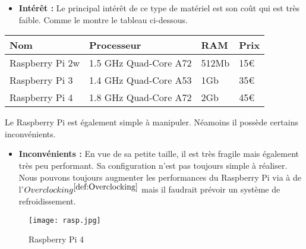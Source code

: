         \begin{flushleft}
            \begin{itemize}
                \item \textbf{Intérêt :}
                Le principal intérêt de ce type de matériel est son coût qui est très faible. Comme le montre le tableau ci-dessous.
            \end{itemize}                       

            \begin{center}
                \begin{tabular}{ |p{3cm}|p{3cm}|p{3cm}|p{3cm}|  }
                    \hline
                    Nom & Processeur & RAM & Prix\\
                    \hline
                    Raspberry Pi 2w & 1.5 GHz Quad-Core A72 & 512Mb & 15€\\
                    \hline
                    Raspberry Pi 3 & 1.4 GHz Quad-Core A53 & 1Gb & 35€\\
                    \hline
                    Raspberry Pi 4 & 1.8 GHz Quad-Core A72 & 2Gb & 45€\\
                    \hline
                \end{tabular}            
            \end{center}

            Le Raspberry Pi est également simple à manipuler. Néamoins il possède certains inconvénients.

            \begin{center}
                \begin{itemize}
                    \item \textbf{Inconvénients :}
                    En vue de sa petite taille, il est très fragile mais également très peu performant.
                    Sa configuration n'est pas toujours simple à réaliser.
                    Nous pouvons toujours augmenter les performances du Raspberry Pi via à de l'\underline{$ Overclocking^{\ref{def:Overclocking}}$} mais il faudrait prévoir un système de refroidissement.
                \end{itemize}
            \end{center}


        \end{flushleft}     
            
        \begin{figure}[ht]
            \centering
            \texttt{[image: rasp.jpg]}
            \caption{Raspberry Pi 4}
        \end{figure}
        
